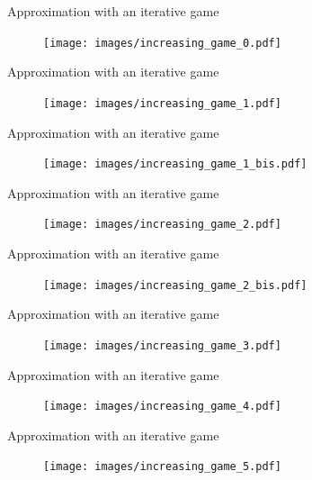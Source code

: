\documentclass[10pt]{beamer}
\begin{document}
    



\begin{frame}{Approximation with an iterative game}
  \begin{figure}
        \texttt{[image: images/increasing\_game\_0.pdf]}
\end{figure}
\end{frame}

\begin{frame}{Approximation with an iterative game}
  \begin{figure}
        \texttt{[image: images/increasing\_game\_1.pdf]}
\end{figure}
\end{frame}


\begin{frame}{Approximation with an iterative game}
  \begin{figure}
        \texttt{[image: images/increasing\_game\_1\_bis.pdf]}
\end{figure}
\end{frame}


\begin{frame}{Approximation with an iterative game}
  \begin{figure}
        \texttt{[image: images/increasing\_game\_2.pdf]}
\end{figure}
\end{frame}

\begin{frame}{Approximation with an iterative game}
  \begin{figure}
        \texttt{[image: images/increasing\_game\_2\_bis.pdf]}
\end{figure}
\end{frame}

\begin{frame}{Approximation with an iterative game}
  \begin{figure}
        \texttt{[image: images/increasing\_game\_3.pdf]}
\end{figure}
\end{frame}


\begin{frame}{Approximation with an iterative game}
  \begin{figure}
        \texttt{[image: images/increasing\_game\_4.pdf]}
\end{figure}
\end{frame}


\begin{frame}{Approximation with an iterative game}
  \begin{figure}
        \texttt{[image: images/increasing\_game\_5.pdf]}
\end{figure}
\end{frame}
\end{document}
